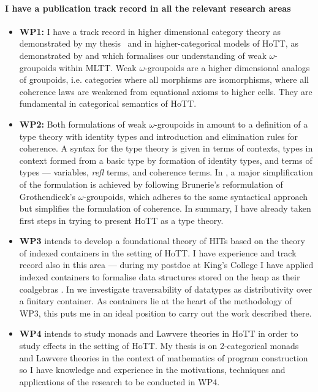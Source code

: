 \documentclass[a4paper]{article}
\newcommand{\mltt}{MLTT}
\begin{document}
\paragraph{I have a publication track record in all the relevant research areas}
\begin{itemize}
\item {\bf WP1:} I have a track record in higher dimensional category
  theory as demonstrated by my thesis~\cite{RypacekThesis} and in
  higher-categorical models of HoTT, as demonstrated by
   and 
  which formalises our understanding of weak $\omega$-groupoids within
  \mltt. Weak $\omega$-groupoids are a higher dimensional analogs of
  groupoids, i.e. categories where all morphisms are isomorphisms,
  where all coherence laws are weakened from equational axioms to
  higher cells. They are fundamental in categorical semantics of HoTT.

\item {\bf WP2:} Both formulations of weak $\omega$-groupoids in
   amount to a
  definition of a type theory with identity types and introduction and
  elimination rules for coherence. A syntax for the type theory is
  given in terms of contexts, types in context formed from a basic
  type by formation of identity types, and terms of types ---
  variables, \emph{refl} terms, and coherence terms. In
  , a major simplification of the
  formulation is achieved by following Brunerie's reformulation of
  Grothendieck's $\omega$-groupoids, which adheres to the same
  syntactical approach but simplifies the formulation of coherence. In
  summary, I have already taken first steps in trying to present HoTT
  as a type theory.

\item {\bf WP3} intends to develop a foundational theory of HITs based
  on the theory of indexed containers in the setting of HoTT. I have
  experience and track record also in this area --- during my postdoc
  at King's College I have applied indexed containers to formalise
  data structures stored on the heap as their coalgebras
  . In  we
  investigate traversability of datatypes as distributivity over a
  finitary container. As containers lie at the heart of the
  methodology of WP3, this puts me in an ideal position to carry out
  the work described there.

\item {\bf WP4} intends to study monads and Lawvere theories in HoTT
  in order to study effects in the setting of HoTT.  My thesis
   is on 2-categorical monads and Lawvere
  theories in the context of mathematics of program construction so I
  have knowledge and experience in the motivations, techniques and
  applications of the research to be conducted in WP4.
\end{itemize}
\end{document}
